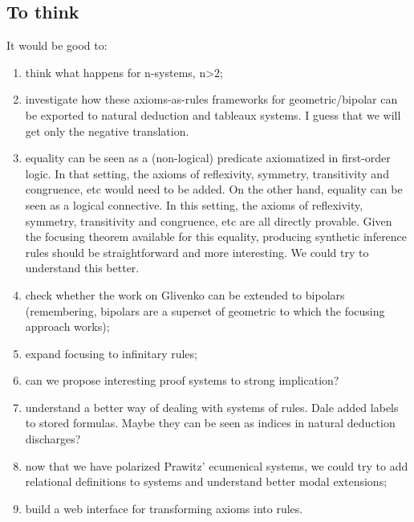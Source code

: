 \subsection{To think}
It would be good to:
\begin{enumerate}
\item think what happens for n-systems, n>2;
\item  investigate how these axioms-as-rules frameworks for geometric/bipolar can be exported to natural deduction and tableaux systems. I guess that we will get only the negative translation.
\item equality can be seen as a (non-logical) predicate axiomatized in first-order logic.  In that setting, the axioms of reflexivity, symmetry, transitivity and congruence, etc would need to be added. On the other hand, equality can be seen as a logical connective.  In this setting, the axioms of reflexivity, symmetry, transitivity and congruence, etc are all directly provable. Given the focusing theorem available for this equality, producing synthetic inference rules should be straightforward and more interesting. We could try to understand this better.
\item check whether the work on Glivenko can be extended to bipolars (remembering, bipolars are a superset of geometric to which the focusing approach works);
\item expand focusing to infinitary rules;
\item can we propose interesting proof systems to strong implication?
\item understand a better way of dealing with systems of rules. Dale  added labels to stored formulas. Maybe they can be seen as indices in natural deduction discharges?
\item now that we have polarized Prawitz' ecumenical systems, we could try to add relational definitions to systems and understand better modal extensions;
\item build a web interface for transforming axioms into rules.
\end{enumerate}

